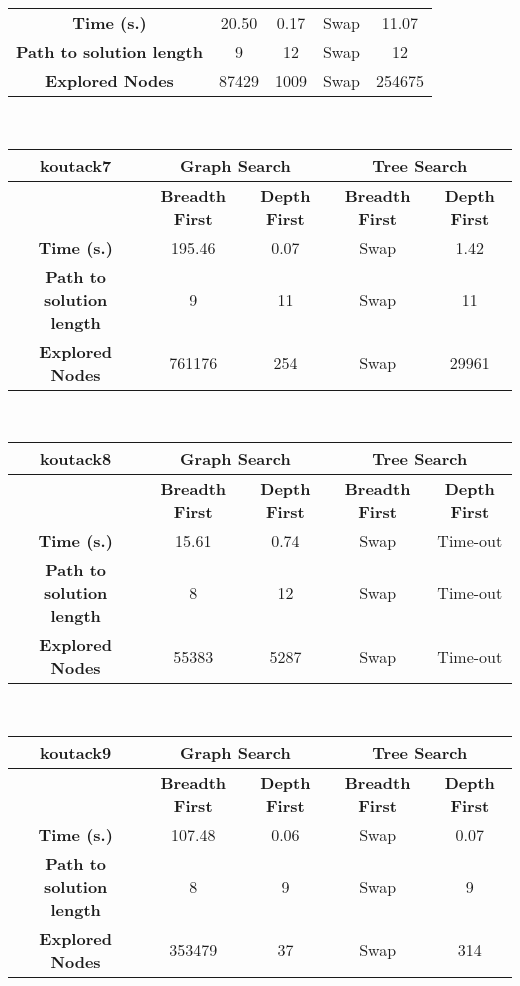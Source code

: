 \begin{description}
\begin{tabular}{|c|c|c|c|c|}
\hline \textbf{Time (s.)} & 20.50 & 0.17 & Swap & 11.07\\ \textbf{Path to solution length} & 9 & 12 & Swap & 12 \\ \textbf{Explored Nodes} & 87429 & 1009 & Swap & 254675\\ 
\hline 
\end{tabular}\\
\begin{tabular}{|c|c|c|c|c|} 
\hline \textbf{koutack7} & \multicolumn{2}{|c|}{\textbf{Graph Search}} & \multicolumn{2}{|c|}{\textbf{Tree Search}} \\ \hline & \textbf{Breadth First} &  \textbf{Depth First} & \textbf{Breadth First} &  \textbf{Depth First}\\ 
\hline \textbf{Time (s.)} & 195.46 & 0.07 & Swap & 1.42\\ \textbf{Path to solution length}& 9 & 11  & Swap & 11 \\ \textbf{Explored Nodes} & 761176 & 254  & Swap & 29961
\\ 
\hline 
\end{tabular}\\
\begin{tabular}{|c|c|c|c|c|} 
\hline \textbf{koutack8} & \multicolumn{2}{|c|}{\textbf{Graph Search}} & \multicolumn{2}{|c|}{\textbf{Tree Search}} \\ \hline & \textbf{Breadth First} &  \textbf{Depth First} & \textbf{Breadth First} &  \textbf{Depth First}\\ 
\hline \textbf{Time (s.)} & 15.61 & 0.74  & Swap & Time-out\\ \textbf{Path to solution length} & 8 & 12  & Swap & Time-out \\ \textbf{Explored Nodes} & 55383 & 5287 & Swap & Time-out\\ 
\hline 
\end{tabular}\\
\begin{tabular}{|c|c|c|c|c|} 
\hline \textbf{koutack9} & \multicolumn{2}{|c|}{\textbf{Graph Search}} & \multicolumn{2}{|c|}{\textbf{Tree Search}} \\ \hline & \textbf{Breadth First} &  \textbf{Depth First} & \textbf{Breadth First} &  \textbf{Depth First}\\ 
\hline \textbf{Time (s.)} & 107.48 & 0.06  & Swap & 0.07\\ \textbf{Path to solution length}& 8  & 9 & Swap & 9\\ \textbf{Explored Nodes}& 353479 & 37  & Swap & 314\\ 

\end{tabular}
\end{description}
